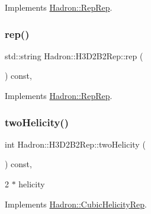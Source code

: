 Implements \mbox{\hyperlink{structHadron_1_1RepRep_ab3213025f6de249f7095892109575fde}{Hadron\+::\+Rep\+Rep}}.

\mbox{\label{structHadron_1_1H3D2B2Rep_af5ed865d7a3f08904144cb23f152ecb5}} 
\subsubsection{\texorpdfstring{rep()}{rep()}\hspace{0.1cm}{\footnotesize\ttfamily [5/5]}}
{\footnotesize\ttfamily std\+::string Hadron\+::\+H3\+D2\+B2\+Rep\+::rep (\begin{DoxyParamCaption}{ }\end{DoxyParamCaption}) const\hspace{0.3cm}{\ttfamily [inline]}, {\ttfamily [virtual]}}



Implements \mbox{\hyperlink{structHadron_1_1RepRep_ab3213025f6de249f7095892109575fde}{Hadron\+::\+Rep\+Rep}}.

\mbox{\label{structHadron_1_1H3D2B2Rep_ad64aabbb6d77c697acb2c327018ecfea}} 
\subsubsection{\texorpdfstring{twoHelicity()}{twoHelicity()}\hspace{0.1cm}{\footnotesize\ttfamily [1/3]}}
{\footnotesize\ttfamily int Hadron\+::\+H3\+D2\+B2\+Rep\+::two\+Helicity (\begin{DoxyParamCaption}{ }\end{DoxyParamCaption}) const\hspace{0.3cm}{\ttfamily [inline]}, {\ttfamily [virtual]}}

2 $\ast$ helicity 

Implements \mbox{\hyperlink{structHadron_1_1CubicHelicityRep_af507aa56fc2747eacc8cb6c96db31ecc}{Hadron\+::\+Cubic\+Helicity\+Rep}}.

\mbox{\label{structHadron_1_1H3D2B2Rep_ad64aabbb6d77c697acb2c327018ecfea}} 
